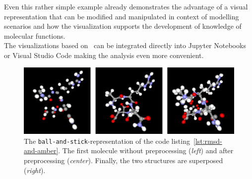 Even this rather simple example already demonstrates the advantage of a visual representation that can be modified and manipulated in context of modelling scenarios and how the visualization supports the development of knowledge of molecular functions. \\
The visualizations based on \bioviz\ can be integrated directly into Jupyter Notebooks or Visual Studio Code making the analysis even more convenient.



\begin{figure}[t]
	\includegraphics[width=18cm]{gfx/biovis.png}
	\caption{The \texttt{ball-and-stick}-representation of the code listing~\ref{lst:rmsd-and-amber}. The first molecule without preprocessing (\textit{left}) and after preprocessing (\textit{center}). Finally, the two structures are superposed (\textit{right}).}
	\label{fig:biochem_visualization}
\end{figure}
